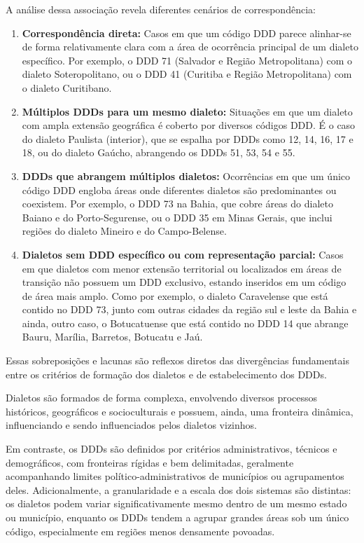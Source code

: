 A análise dessa associação revela diferentes cenários de correspondência:
\begin{enumerate}
    \item \textbf{Correspondência direta:} Casos em que um código DDD parece alinhar-se de forma relativamente clara com a área de ocorrência principal de um dialeto específico. Por exemplo, o DDD 71 (Salvador e Região Metropolitana) com o dialeto Soteropolitano, ou o DDD 41 (Curitiba e Região Metropolitana) com o dialeto Curitibano.
    \item \textbf{Múltiplos DDDs para um mesmo dialeto:} Situações em que um dialeto com ampla extensão geográfica é coberto por diversos códigos DDD. É o caso do dialeto Paulista (interior), que se espalha por DDDs como 12, 14, 16, 17 e 18, ou do dialeto Gaúcho, abrangendo os DDDs 51, 53, 54 e 55.
    \item \textbf{DDDs que abrangem múltiplos dialetos:} Ocorrências em que um único código DDD engloba áreas onde diferentes dialetos são predominantes ou coexistem. Por exemplo, o DDD 73 na Bahia, que cobre áreas do dialeto Baiano e do Porto-Segurense, ou o DDD 35 em Minas Gerais, que inclui regiões do dialeto Mineiro e do Campo-Belense.
    \item \textbf{Dialetos sem DDD específico ou com representação parcial:} Casos em que dialetos com menor extensão territorial ou localizados em áreas de transição não possuem um DDD exclusivo, estando inseridos em um código de área mais amplo. Como por exemplo, o dialeto Caravelense que está contido no DDD 73, junto com outras cidades da região sul e leste da Bahia e ainda, outro caso, o Botucatuense que está contido no DDD 14 que abrange Bauru, Marília, Barretos, Botucatu e Jaú.
\end{enumerate}

Essas sobreposições e lacunas são reflexos diretos das divergências fundamentais entre os critérios de formação dos dialetos e de estabelecimento dos DDDs. 

Dialetos são formados de forma complexa, envolvendo diversos processos históricos, geográficos e socioculturais e possuem, ainda, uma fronteira dinâmica, influenciando e sendo influenciados pelos dialetos vizinhos.


Em contraste, os DDDs são definidos por critérios administrativos, técnicos e demográficos, com fronteiras rígidas e bem delimitadas, geralmente acompanhando limites político-administrativos de municípios ou agrupamentos deles. Adicionalmente, a granularidade e a escala dos dois sistemas são distintas: os dialetos podem variar significativamente mesmo dentro de um mesmo estado ou município, enquanto os DDDs tendem a agrupar grandes áreas sob um único código, especialmente em regiões menos densamente povoadas.



